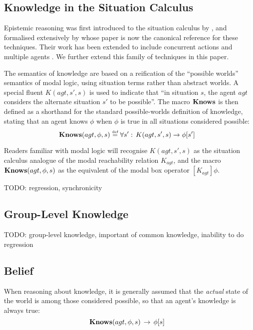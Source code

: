 \subsection{Knowledge in the Situation Calculus}

Epistemic reasoning was first introduced to the situation calculus
by \citet{moore80know_act}, and formalised extensively by \citet{scherl03sc_knowledge}
whose paper is now the canonical reference for these techniques. Their
work has been extended to include concurrent actions \citep{scherl03conc_knowledge}
and multiple agents \citep{shapiro98specifying_ma_systems}. We further
extend this family of techniques in this paper.

The semantics of knowledge are based on a reification of the {}``possible
worlds'' semantics of modal logic, using situation terms rather than
abstract worlds. A special fluent $K(agt,s',s)$ is used to indicate
that {}``in situation $s$, the agent $agt$ considers the alternate
situation $s'$ to be possible''. The macro $\mathbf{Knows}$ is then defined
as a shorthand for the standard possible-worlds definition of knowledge,
stating that an agent knows $\phi$ when $\phi$ is true in all situations
considered possible: \begin{equation}
\mathbf{Knows}(agt,\phi,s)\stackrel{\mbox{\tiny def}}{=}\forall s':\, K(agt,s',s)\rightarrow\phi[s']\label{eqn:Background:knows_def}\end{equation}


Readers familiar with modal logic will recognise $K(agt,s',s)$ as
the situation calculus analogue of the modal reachability relation
$K_{agt}$, and the macro $\mathbf{Knows}(agt,\phi,s)$ as the equivalent
of the modal box operator $[K_{agt}]\phi$.

TODO: regression, synchronicity


\subsection{Group-Level Knowledge}

TODO: group-level knowledge, important of common knowledge, inability
to do regression


\subsection{Belief}

When reasoning about knowledge, it is generally assumed that the \emph{actual}
state of the world is among those considered possible, so that an
agent's knowledge is always true:\[
\mathbf{Knows}(agt,\phi,s)\,\rightarrow\,\phi[s]\]


